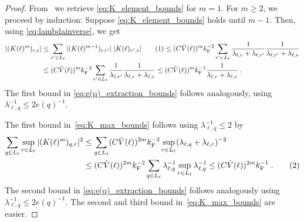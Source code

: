 \documentclass[12pt,a4paper]{article}
\numberwithin{equation}{section}
\newcommand{\1}{\mathbb{I}}
\newcommand{\F}{\mathrm{F}}
\newcommand{\HS}{\mathrm{HS}}
\newcommand{\kF}{k_\F}
\newcommand{\tagg}[1]{ \stepcounter{equation} \tag{\theequation}
\label{#1} } %
\newcommand{\normmaxi}[1]{\norm{#1}_{\mathrm{max,1}}}
\theoremstyle{plain}
\theoremstyle{definition}
\theoremstyle{remark}
\theoremstyle{plain}
\theoremstyle{definition}
\theoremstyle{remark}
\begin{document}
\begin{proof}
From~\cite[Prop.~7.10]{CHN23} we retrieve \eqref{eq:K_element_bounds} for $ m = 1 $. For $ m \ge 2 $, we proceed by induction: Suppose \eqref{eq:K_element_bounds} holds until $ m-1 $. Then, using \eqref{eq:lambdainverse}, we get
\begin{align*}
		|(K(\ell)^m)_{r,s}|
		&\le \sum_{r' \in L_\ell}
		|(K(\ell)^{m-1})_{r,r'}| \;
		|K(\ell)_{r',s}| \tagg{eq:notimportant1}
		\le (C \hat{V}(\ell))^m \kF^{-2} \sum_{r' \in L_\ell}
		\frac{1}{\lambda_{\ell, r} + \lambda_{\ell, r'}}
		\frac{1}{\lambda_{\ell, r'} + \lambda_{\ell, s}} \\
		&\le (C \hat{V}(\ell))^m \kF^{-2} \sum_{r' \in L_\ell}
		\frac{1}{\lambda_{\ell, r'}} \frac{1}{\lambda_{\ell, r} + \lambda_{\ell, s}}
		\le (C \hat{V}(\ell))^m \kF^{-1}
		\frac{1}{\lambda_{\ell, r} + \lambda_{\ell, s}} \;.
\end{align*}
The first bound in \eqref{eq:e(q)_extraction_bounds} follows analogously, using $\lambda_{\ell,q}^{-1} \leq 2 e(q)^{-1}$.

The first bound in~\eqref{eq:K_max_bounds} follows using $ \lambda_{\ell,q}^{-1} \le 2 $ by
\begin{align*}
	\sum_{q \in L_\ell} \sup_{r \in L_\ell} |(K(\ell)^m)_{q,r}|^2
	&\le \sum_{q \in L_\ell} (C \hat{V}(\ell))^{2m} \kF^{-2} \sup_{r \in L_\ell} (\lambda_{\ell,q} + \lambda_{\ell,r})^{-2} \\
	&
	\le (C \hat{V}(\ell))^{2m} \kF^{-2} \sum_{q \in L_\ell} \lambda_{\ell,q}^{-1} \sup_{r \in L_\ell} \lambda_{\ell,q}^{-1} \le (C \hat{V}(\ell))^{2m} \kF^{-1} \;. \tagg{eq:notimportant}
\end{align*}
The second bound in \eqref{eq:e(q)_extraction_bounds} follows analogously using $\lambda_{\ell,q}^{-1} \leq 2 e(q)^{-1}$.
The second and third bound in~\eqref{eq:K_max_bounds} are easier.
\end{proof}
\end{document}
